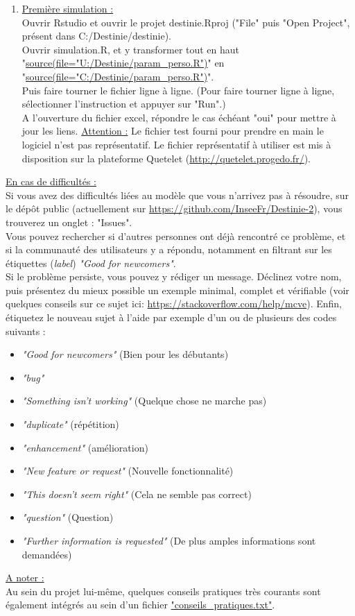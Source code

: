 \begin{enumerate}
\item \underline{Première simulation :}\\
Ouvrir Rstudio et ouvrir le projet destinie.Rproj ("File" puis "Open Project", présent dans C:/Destinie/destinie).\\
Ouvrir simulation.R, et y transformer tout en haut "\url{source(file="U:/Destinie/param_perso.R")}" en "\url{source(file="C:/Destinie/param_perso.R")}".\\
Puis faire tourner le fichier ligne à ligne. (Pour faire tourner ligne à ligne, sélectionner l'instruction et appuyer sur "Run".) \\
A l'ouverture du fichier excel, répondre le cas échéant "oui" pour mettre à jour les liens.
\underline{Attention :} Le fichier test fourni pour prendre en main le logiciel n'est pas représentatif. Le fichier représentatif à utiliser est mis à disposition sur la plateforme Quetelet (\url{http://quetelet.progedo.fr/}).\\


\end{enumerate}

\underline{En cas de difficultés :}\\
Si vous avez des difficultés liées au modèle que vous n'arrivez pas à résoudre, sur le dépôt public (actuellement sur \url{https://github.com/InseeFr/Destinie-2}), vous trouverez un onglet : "Issues".\\
Vous pouvez rechercher si d'autres personnes ont déjà rencontré ce problème, et si la communauté des utilisateurs y a répondu, notamment en filtrant sur les étiquettes (\textit{label}) \textit{"Good for newcomers"}.\\
Si le problème persiste, vous pouvez y rédiger un message. Déclinez votre nom, puis présentez du mieux possible un exemple minimal, complet et vérifiable (voir quelques conseils sur ce sujet ici: \url{https://stackoverflow.com/help/mcve}). Enfin, étiquetez le nouveau sujet à l'aide par exemple d'un ou de plusieurs des codes suivants :
\begin{itemize}
\item \textit{"Good for newcomers"} (Bien pour les débutants)
\item \textit{"bug"}
\item \textit{"Something isn't working"} (Quelque chose ne marche pas)
\item \textit{"duplicate"} (répétition)
\item \textit{"enhancement"} (amélioration)
\item \textit{"New feature or request"} (Nouvelle fonctionnalité)
\item \textit{"This doesn't seem right"} (Cela ne semble pas correct)
\item \textit{"question"} (Question)
\item \textit{"Further information is requested"} (De plus amples informations sont demandées)\\
\end{itemize}


\underline{A noter :}\\
Au sein du projet lui-même, quelques conseils pratiques très courants sont également intégrés au sein d'un fichier \url{"conseils_pratiques.txt"}.